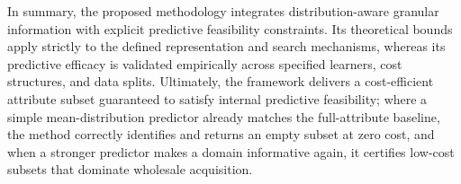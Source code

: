 In summary, the proposed methodology integrates distribution-aware granular information with explicit predictive feasibility constraints. Its theoretical bounds apply strictly to the defined representation and search mechanisms, whereas its predictive efficacy is validated empirically across specified learners, cost structures, and data splits. Ultimately, the framework delivers a cost-efficient attribute subset guaranteed to satisfy internal predictive feasibility; where a simple mean-distribution predictor already matches the full-attribute baseline, the method correctly identifies and returns an empty subset at zero cost, and when a stronger predictor makes a domain informative again, it certifies low-cost subsets that dominate wholesale acquisition.
